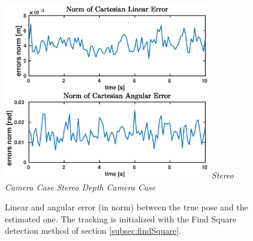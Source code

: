 \begin{figure}
{		\includegraphics[width=9cm]{tracking/square-depth.eps}
	}
	\hspace*{20px}\textit{Stereo Camera Case} \hspace{135px} \textit{Stereo Depth Camera Case}\\
	\vspace{30px}
	\caption[Tracking error plots with Find Square detection initialization]{Linear and angular error (in norm) between the true pose and the estimated one. The tracking is initialized with the Find Square detection method of section \ref{subsec:findSquare}.}
	\label{fig:squareErrors}
\end{figure}


